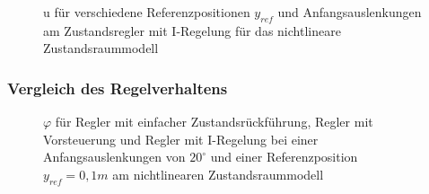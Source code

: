 \begin{figure}[H]
    \centering
    \caption[u für Regler mit I-Regelung (nichtlinear)]{u für verschiedene Referenzpositionen $y_{ref}$ und Anfangsauslenkungen am Zustandsregler mit I-Regelung für das nichtlineare Zustandsraummodell}
    \label{fig:Bild39}
\end{figure}

\subsubsection{Vergleich des Regelverhaltens}

\begin{figure}[H]
    \centering
    \caption[Reglervergleich für $\varphi$ (nichtlinear)]{$\varphi$ für Regler mit einfacher Zustandsrückführung, Regler mit Vorsteuerung und Regler mit I-Regelung bei einer Anfangsauslenkungen von $20^\circ$ und einer Referenzposition $y_{ref} = 0,1 m$ am nichtlinearen Zustandsraummodell}
    \label{fig:Bild40}
\end{figure}

